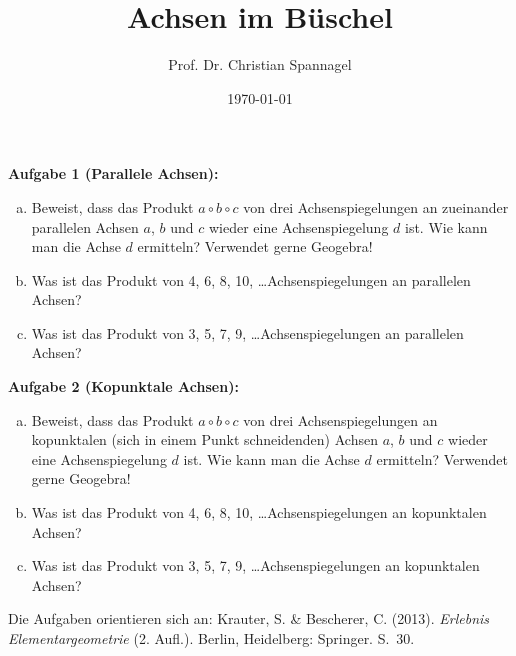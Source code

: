 \documentclass{../cssheet}
\title{Achsen im Büschel}
\author{Prof. Dr. Christian Spannagel}
\date{\today}
\begin{document}
\printtitle

\textbf{Aufgabe 1 (Parallele Achsen):} 
\begin{enumerate}[a)]
\item Beweist, dass das Produkt $a\circ b\circ c$ von drei Achsenspiegelungen an zueinander parallelen Achsen $a$, $b$ und $c$ wieder eine Achsenspiegelung $d$ ist. Wie kann man die Achse $d$ ermitteln? Verwendet gerne Geogebra!
\item Was ist das Produkt von 4, 6, 8, 10, \ldots Achsenspiegelungen an parallelen Achsen?
\item Was ist das Produkt von 3, 5, 7, 9, \ldots Achsenspiegelungen an parallelen Achsen?
\end{enumerate}

\textbf{Aufgabe 2 (Kopunktale Achsen):} 
\begin{enumerate}[a)]
\item Beweist, dass das Produkt $a\circ b\circ c$ von drei Achsenspiegelungen an kopunktalen (sich in einem Punkt schneidenden) Achsen $a$, $b$ und $c$ wieder eine Achsenspiegelung $d$ ist. Wie kann man die Achse $d$ ermitteln? Verwendet gerne Geogebra!
\item Was ist das Produkt von 4, 6, 8, 10, \ldots Achsenspiegelungen an kopunktalen Achsen?
\item Was ist das Produkt von 3, 5, 7, 9, \ldots Achsenspiegelungen an kopunktalen Achsen?
\end{enumerate}


Die Aufgaben orientieren sich an: Krauter, S. \& Bescherer, C. (2013). \emph{Erlebnis Elementargeometrie} (2. Aufl.). Berlin, Heidelberg: Springer. S.~30.

\vspace*{10mm}

\printlicense

\printsocials
\end{document}

